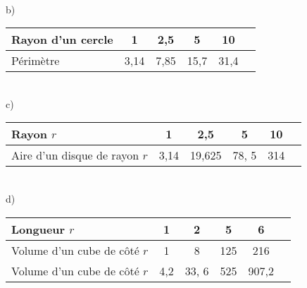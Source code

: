 \documentclass[12 pt]{extarticle}
\theoremstyle{plain}
\begin{document}
 \ \\ 
 
b) \begin{tabular}{|l | c | c | c | c | c}
\hline
Rayon d'un cercle & 1 & 2,5 &  5 & 10 \\
\hline
Périmètre & 3,14 &7,85 & 15,7& 31,4\\ \hline

\end{tabular}

 \ \\ 
 
 
c) \begin{tabular}{|l | c | c | c | c | c}
\hline
Rayon $r$ & 1 & 2,5 &  5 & 10 \\
\hline
Aire d'un disque de rayon $r$ & 3,14 & 19,625 & 78, 5& 314\\ \hline

\end{tabular}

 \ \\ 
 
d) \begin{tabular}{|l | c | c | c | c | c}
\hline
Longueur $r$ & 1 & 2 &  5 & 6 \\
\hline
Volume d'un cube de côté $r$ & 1 & 8 & 125 & 216 \\ \hline
Volume d'un cube de côté $r$ & 4,2 & 33, 6 & 525& 907,2\\ \hline

\end{tabular}
 



 	
\end{document}
